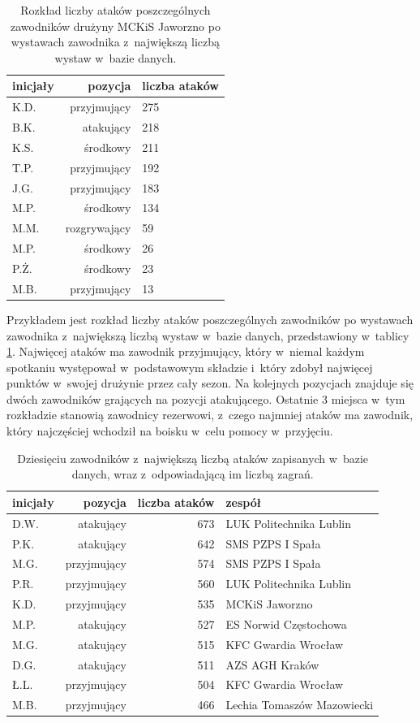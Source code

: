 \documentclass[a4paper,twoside,12pt]{book}
\begin{document}
\begin{table}
\centering
\caption{Rozkład liczby ataków poszczególnych zawodników drużyny MCKiS Jaworzno po wystawach zawodnika z~największą liczbą wystaw w~bazie danych.}
\label{tab:liczbaAtakowJaworzno}
\begin{tabular}{lrl}
\toprule
{inicjały} & {pozycja} & {liczba ataków} \\ 
\midrule
K.D. & przyjmujący & 275 \\
B.K. & atakujący & 218 \\ 
K.S. & środkowy & 211 \\ 
T.P. & przyjmujący & 192 \\ 
J.G. & przyjmujący & 183 \\ 
M.P. & środkowy & 134 \\ 
M.M. & rozgrywający & 59 \\ 
M.P. & środkowy & 26 \\ 
P.Ż. & środkowy & 23 \\
M.B. & przyjmujący & 13 \\ 
\bottomrule
\end{tabular}
\end{table}

Przykładem jest rozkład liczby ataków poszczególnych zawodników po wystawach zawodnika z~największą liczbą wystaw w~bazie danych, przedstawiony w~tablicy \ref{tab:liczbaAtakowJaworzno}. Najwięcej ataków ma zawodnik przyjmujący, który w~niemal każdym spotkaniu występował w~podstawowym składzie i~który zdobył najwięcej punktów w~swojej drużynie przez cały sezon. Na kolejnych pozycjach znajduje się dwóch zawodników grających na pozycji atakującego. Ostatnie 3 miejsca w~tym rozkładzie stanowią zawodnicy rezerwowi, z~czego najmniej ataków ma zawodnik, który najczęściej wchodził na boisku w~celu pomocy w~przyjęciu. 

\begin{table}
\centering
\caption{Dziesięciu zawodników z~największą liczbą ataków zapisanych w~bazie danych, wraz z~odpowiadającą im liczbą zagrań.}
\label{tab:liczbaZagranAtak}
\begin{tabular}{lrrl}
\toprule
{inicjały} & {pozycja} & {liczba ataków} & {zespół} \\
\midrule
D.W. & atakujący & 673 & LUK Politechnika Lublin \\
P.K. & atakujący & 642 & SMS PZPS I Spała \\ 
M.G. & przyjmujący & 574 & SMS PZPS I Spała \\ 
P.R. & przyjmujący & 560 & LUK Politechnika Lublin \\ 
K.D. & przyjmujący & 535 & MCKiS Jaworzno \\
M.P. & atakujący & 527 & ES Norwid Częstochowa \\ 
M.G. & atakujący & 515 & KFC Gwardia Wrocław \\
D.G. & atakujący & 511 & AZS AGH Kraków \\ 
Ł.L. & przyjmujący & 504 & KFC Gwardia Wrocław \\ 
M.B. & przyjmujący & 466 & Lechia Tomaszów Mazowiecki \\
\bottomrule
\end{tabular}
\end{table}
\end{document}
